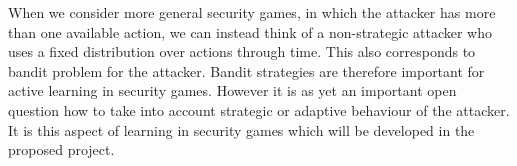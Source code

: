 When we consider more general security games, in which the attacker has more than one available action, we can instead think of a non-strategic attacker who uses a fixed distribution over actions through time.  This also corresponds to bandit problem for the attacker.
Bandit strategies are therefore important for active learning in security games.  However it is as yet an important open question how to take into account strategic or adaptive behaviour of the attacker.  It is this aspect of learning in security games which will be developed in the proposed project.
  






